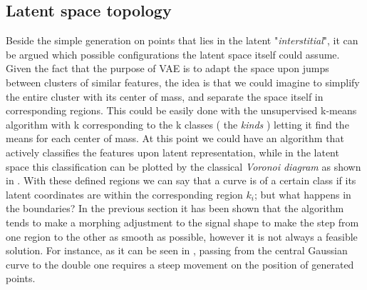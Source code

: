 \subsection{Latent space topology}
Beside the simple generation on points that lies in the latent "\textit{interstitial}", it can be argued which possible configurations the latent space itself could assume. Given the fact that the purpose of \acs{VAE} is to adapt the space upon jumps between clusters of similar features, the idea is that we could imagine to simplify the entire cluster with its center of mass, and separate the space itself in corresponding regions. This could be easily done with the unsupervised k-means algorithm with k corresponding to the k classes ( the \textit{kinds} ) letting it find the means for each center of mass. At this point we could have an algorithm that actively classifies the features upon latent representation, while in the latent space this classification can be plotted by the classical \textit{Voronoi diagram} as shown in \Figure{\ref{fig:voronoi_ls}}. With these defined regions we can say that a curve is of a certain class if its latent coordinates are within the corresponding region $k_i$; but what happens in the boundaries? In the previous section it has been shown that the algorithm tends to make a morphing adjustment to the signal shape to make the step from one region to the other as smooth as possible, however it is not always a feasible solution. For instance, as it can be seen in \Figure{\ref{fig:step1_morph_gn4}}, passing from the central Gaussian curve to the double one requires a steep movement on the position of generated points.
